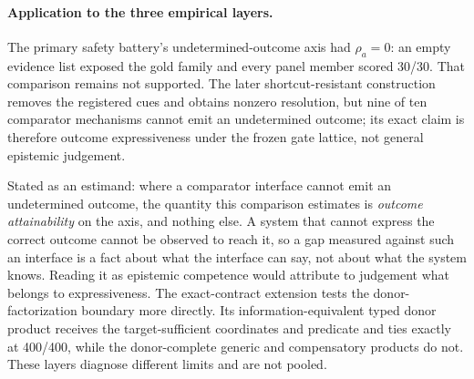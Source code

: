 \paragraph{Application to the three empirical layers.}
The primary safety battery's undetermined-outcome axis had $\rho_a=0$: an
empty evidence list exposed the gold family and every panel member scored 30/30.
That comparison remains not supported.  The later shortcut-resistant
construction removes the registered cues and obtains nonzero resolution, but
nine of ten comparator mechanisms cannot emit an undetermined outcome; its exact
claim is therefore outcome expressiveness under the frozen gate lattice, not
general epistemic judgement.

Stated as an estimand: where a comparator interface cannot emit an undetermined
outcome, the quantity this comparison estimates is \emph{outcome attainability}
on the axis, and nothing else. A system that cannot express the correct outcome
cannot be observed to reach it, so a gap measured against such
an interface is a fact about what the interface can say, not about what the
system knows. Reading it as epistemic competence would attribute to judgement
what belongs to expressiveness.
The exact-contract extension tests the donor-factorization boundary more
directly.  Its information-equivalent typed donor product receives the
target-sufficient coordinates and predicate and ties exactly at 400/400, while
the donor-complete generic and compensatory products do not.  These layers
diagnose different limits and are not pooled.

